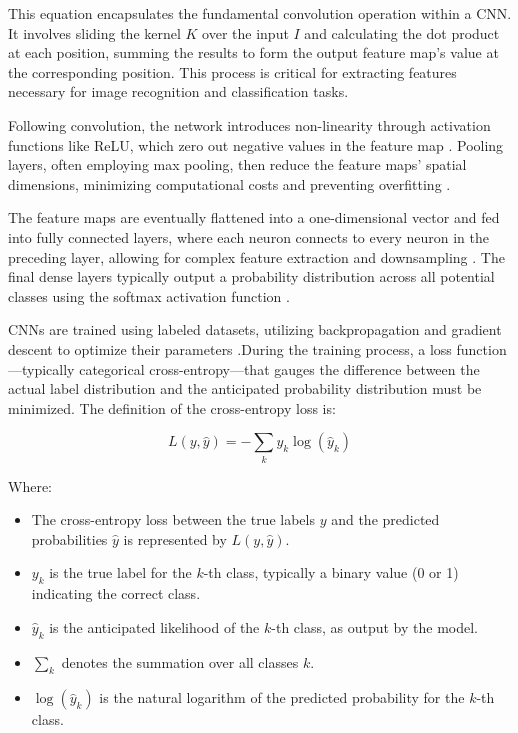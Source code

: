 \documentclass[journal,article,submit,pdftex,moreauthors]{Definitions/mdpi}
\begin{document}
This equation encapsulates the fundamental convolution operation within a CNN. It involves sliding the kernel \(K\) over the input \(I\) and calculating the dot product at each position, summing the results to form the output feature map's value at the corresponding position. This process is critical for extracting features necessary for image recognition and classification tasks.

Following convolution, the network introduces non-linearity through activation functions like ReLU, which zero out negative values in the feature map \cite{glorot2011deep}. Pooling layers, often employing max pooling, then reduce the feature maps' spatial dimensions, minimizing computational costs and preventing overfitting \cite{long2015fully}.

The feature maps are eventually flattened into a one-dimensional vector and fed into fully connected layers, where each neuron connects to every neuron in the preceding layer, allowing for complex feature extraction and downsampling \cite{goodfellow2016deep}. The final dense layers typically output a probability distribution across all potential classes using the softmax activation function \cite{ioffe2015batch}.

CNNs are trained using labeled datasets, utilizing backpropagation and gradient descent to optimize their parameters \cite{ruder2016overview}.During the training process, a loss function—typically categorical cross-entropy—that gauges the difference between the actual label distribution and the anticipated probability distribution must be minimized. The definition of the cross-entropy loss is:

\begin{equation}
    L(y, \hat{y}) = -\sum_{k} y_k \log(\hat{y}_k)
\end{equation}

Where:

\begin{itemize}
  \item The cross-entropy loss between the true labels \(y\) and the predicted probabilities \(\hat{y}\) is represented by \(L(y, \hat{y})\).
  \item \(y_k\) is the true label for the \(k\)-th class, typically a binary value (0 or 1) indicating the correct class.
  \item \(\hat{y}_k\) is the anticipated likelihood of the \(k\)-th class, as output by the model.
  \item \(\sum_{k}\) denotes the summation over all classes \(k\).
  \item \(\log(\hat{y}_k)\) is the natural logarithm of the predicted probability for the \(k\)-th class.
\end{itemize}
\end{document}
